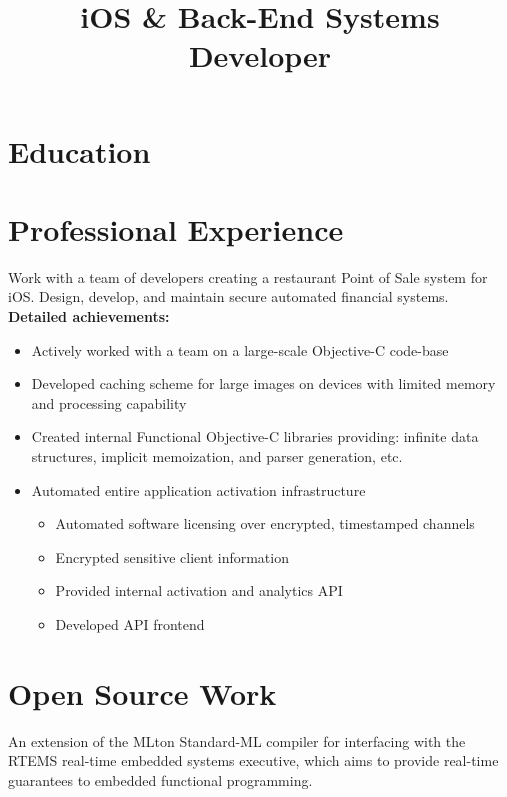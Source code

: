 \documentclass[11pt,a4paper,sans]{moderncv}   %
\title{iOS \& Back-End Systems Developer}                          %
\begin{document}
\makecvtitle

\section{Education}

\section{Professional Experience}
{Work with a team of developers creating a restaurant Point of Sale system for iOS. Design, develop, and maintain secure automated financial systems.
\newline
\textbf{Detailed achievements:}
\begin{itemize}%
\item Actively worked with a team on a large-scale Objective-C code-base
\item Developed caching scheme for large images on devices with limited memory and processing capability
\item Created internal Functional Objective-C libraries providing: infinite data structures, implicit memoization, and parser generation, etc.
\item Automated entire application activation infrastructure
  \begin{itemize}%
  \item Automated software licensing over encrypted, timestamped channels
  \item Encrypted sensitive client information
  \item Provided internal activation and analytics API
  \item Developed API frontend
  \end{itemize}
\end{itemize}}

\section{Open Source Work}
{
An extension of the MLton Standard-ML compiler for interfacing with the RTEMS real-time embedded systems executive, which aims to provide real-time guarantees to embedded functional programming.
}
\end{document}
